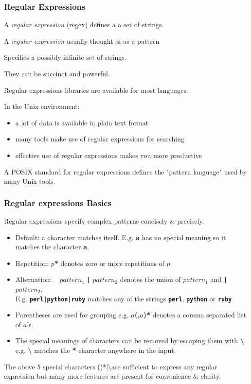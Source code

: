 \begin{frame}
\frametitle{Regular Expressions}
A {\em{regular expression}} (regex) defines a
a set of strings.

A {\em{regular expression}}  usually thought of as a pattern

Specifies a possibly infinite set of strings.

They can be succinct and powerful.

Regular expressions libraries are available for most languages.

In the Unix environment:
\begin{itemize}
\item  a lot of data is available in plain text format
\item  many tools make use of regular expressions for searching
\item  effective use of regular expressions makes you more productive
\end{itemize}

{\small A POSIX standard for regular expressions defines
the "pattern language" used by many Unix tools.}
\end{frame}

\begin{frame}[shrink]
\frametitle{Regular expressions Basics}
Regular expressions  specify complex patterns concisely \& precisely.\\[2ex]

\begin{itemize}
\item  Default: a character matches itself.  E.g. \textbf{a} has no special meaning so it matches the character  \textbf{a}.

\item  Repetition: $p${\bf{\textbf{*}}} denotes zero or more repetitions of $p$.

\item  Alternation:  ~ $pattern_{1}$ {\bf{\textbf{\tt{|}}}} $pattern_{2}$ denotes the union of $pattern_{1}$ and {\bf{\textbf{\tt{|}}}} $pattern_{2}$.\\[2ex]  E.g. \textbf{\tt{perl|python|ruby}} matches any of the strings \textbf{\tt{perl}}, \textbf{\tt{python}} or \textbf{\tt{ruby}} \\[2ex]

\item  Parentheses are used for grouping e.g. $a$\textbf{(,$a$}\textbf{)*} denotes a comma separated list of $a$'s. 

\item  The special meanings of characters can be removed by escaping them with \textbf{\textbackslash}  e.g. \textbf{\textbackslash*} matches the \textbf{*} character anywhere in the input. 
\end{itemize}

The  above 5 special characters ()*|\textbackslash  are sufficient to express any regular expression
but many more features are present for convenience \& clarity.

\end{frame}

